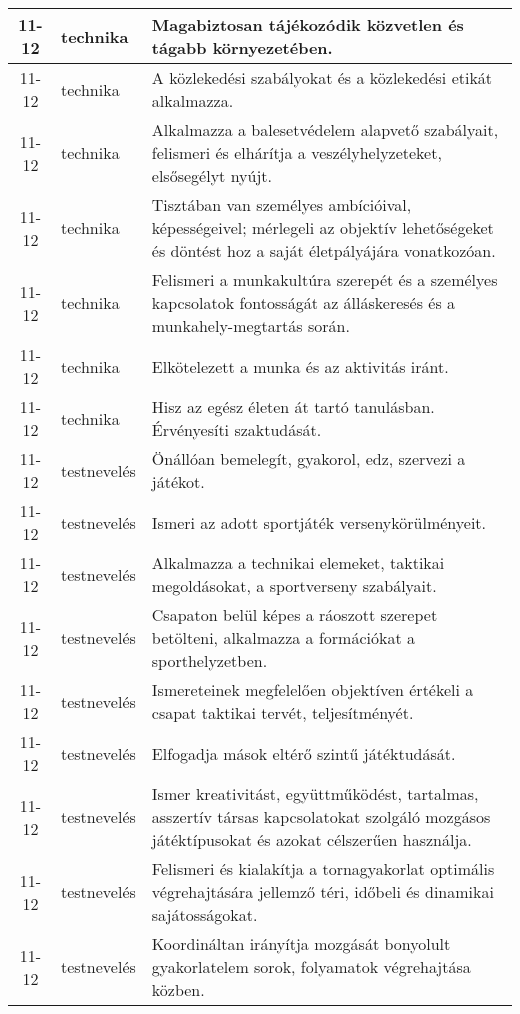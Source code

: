 \begin{small}
\begin{longtable}{c | p{2cm} |  p{11cm} }
              11-12 & technika & Magabiztosan tájékozódik közvetlen és tágabb környezetében. \\ \hline
              11-12 & technika & A közlekedési szabályokat és a közlekedési etikát alkalmazza. \\ \hline
              11-12 & technika & Alkalmazza a balesetvédelem alapvető szabályait, felismeri és elhárítja a veszélyhelyzeteket, elsősegélyt nyújt. \\ \hline
              11-12 & technika & Tisztában van személyes ambícióival, képességeivel; mérlegeli az objektív lehetőségeket és döntést hoz a saját életpályájára vonatkozóan. \\ \hline
              11-12 & technika & Felismeri a munkakultúra szerepét és a személyes kapcsolatok fontosságát az álláskeresés és a munkahely-megtartás során. \\ \hline
              11-12 & technika & Elkötelezett a munka és az aktivitás iránt. \\ \hline
              11-12 & technika & Hisz az egész életen át tartó tanulásban. Érvényesíti szaktudását. \\ \hline
              11-12 & testnevelés & Önállóan bemelegít, gyakorol, edz, szervezi a játékot. \\ \hline
              11-12 & testnevelés & Ismeri az adott sportjáték versenykörülményeit. \\ \hline
              11-12 & testnevelés & Alkalmazza a technikai elemeket, taktikai megoldásokat, a sportverseny szabályait. \\ \hline
              11-12 & testnevelés & Csapaton belül képes a ráoszott szerepet betölteni, alkalmazza a formációkat a sporthelyzetben. \\ \hline
              11-12 & testnevelés & Ismereteinek megfelelően objektíven értékeli a csapat taktikai tervét, teljesítményét. \\ \hline
              11-12 & testnevelés & Elfogadja mások eltérő szintű játéktudását. \\ \hline
              11-12 & testnevelés & Ismer kreativitást, együttműködést, tartalmas, asszertív társas kapcsolatokat szolgáló mozgásos játéktípusokat és azokat célszerűen használja. \\ \hline
              11-12 & testnevelés & Felismeri és kialakítja a tornagyakorlat optimális végrehajtására jellemző téri, időbeli és dinamikai sajátosságokat. \\ \hline
              11-12 & testnevelés & Koordináltan irányítja mozgását bonyolult gyakorlatelem sorok, folyamatok végrehajtása közben. \\ \hline

\end{longtable}
\end{small}
